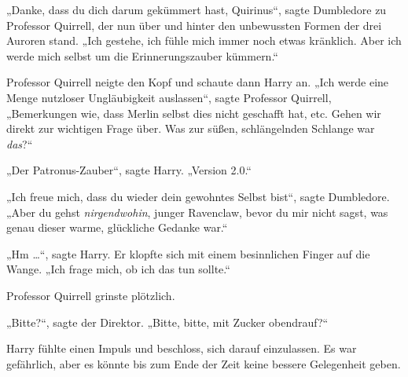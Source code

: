 „Danke, dass du dich darum gekümmert hast, Quirinus“, sagte Dumbledore zu Professor Quirrell, der nun über und hinter den unbewussten Formen der drei Auroren stand. „Ich gestehe, ich fühle mich immer noch etwas kränklich. Aber ich werde mich selbst um die Erinnerungszauber kümmern.“

Professor Quirrell neigte den Kopf und schaute dann Harry an. „Ich werde eine Menge nutzloser Ungläubigkeit auslassen“, sagte Professor Quirrell, „Bemerkungen wie, dass Merlin selbst dies nicht geschafft hat, etc. Gehen wir direkt zur wichtigen Frage über. Was zur süßen, schlängelnden Schlange war \emph{das}?“

„Der Patronus-Zauber“, sagte Harry. „Version 2.0.“

„Ich freue mich, dass du wieder dein gewohntes Selbst bist“, sagte Dumbledore. „Aber du gehst \emph{nirgendwohin}, junger Ravenclaw, bevor du mir nicht sagst, was genau dieser warme, glückliche Gedanke war.“

„Hm …“, sagte Harry. Er klopfte sich mit einem besinnlichen Finger auf die Wange. „Ich frage mich, ob ich das tun sollte.“

Professor Quirrell grinste plötzlich.

„Bitte?“, sagte der Direktor. „Bitte, bitte, mit Zucker obendrauf?“

Harry fühlte einen Impuls und beschloss, sich darauf einzulassen. Es war gefährlich, aber es könnte bis zum Ende der Zeit keine bessere Gelegenheit geben.

